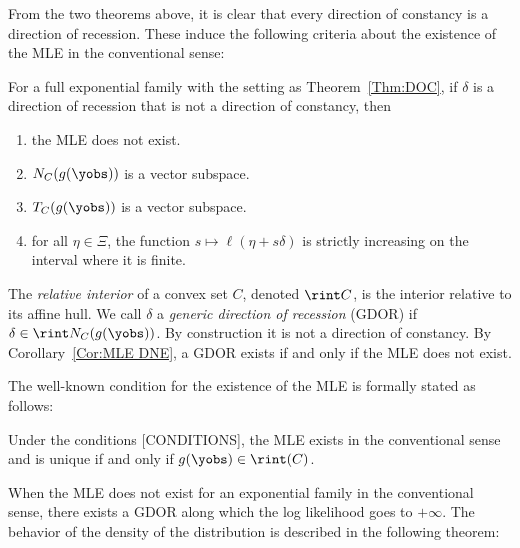 From the two theorems above, it is clear that every direction of constancy is a 
direction of recession.  These induce the following criteria about the existence of 
the MLE in the conventional sense:

\begin{corollary} \label{Cor:MLE DNE}
For a full exponential family with the setting as Theorem~\ref{Thm:DOC}, if $\delta$ 
is a 
direction of recession that is not a direction of constancy, then  
\begin{enumerate}
\item the MLE does not exist.
\item $N_C(g(\yobs))$ is a vector subspace.
\item $T_C(g(\yobs))$ is a vector subspace.
\item for all $\eta \in \Xi$, the function $s \mapsto \ell(\eta + s \delta)$ is 
strictly increasing on 
the interval where it is finite.
\end{enumerate}
\end{corollary}

The \emph{relative interior} of a convex set $C$, denoted $\rint C$, is the interior 
relative to its affine hull.  We call $\delta$ a \emph{generic direction of recession} 
(GDOR) if $\delta \in \rint N_C(g(\yobs))$.  By construction it is not a direction of 
constancy.  By Corollary~\ref{Cor:MLE DNE}, a GDOR exists if and only if the MLE does 
not exist.

The well-known condition for the existence of the MLE \citep{Barndorff, Brown:1986} is 
formally stated as follows:
\begin{theorem} \label{Thm:MLE rint}
Under the conditions [CONDITIONS], the MLE exists in the conventional sense and is 
unique if and only if 
$g(\yobs) \in \rint(C)$.
\end{theorem}

When the MLE does not exist for an exponential family in the conventional sense, there 
exists a GDOR along which the log likelihood goes to $+\infty$.  The behavior of the 
density of the distribution is described in the following theorem:

